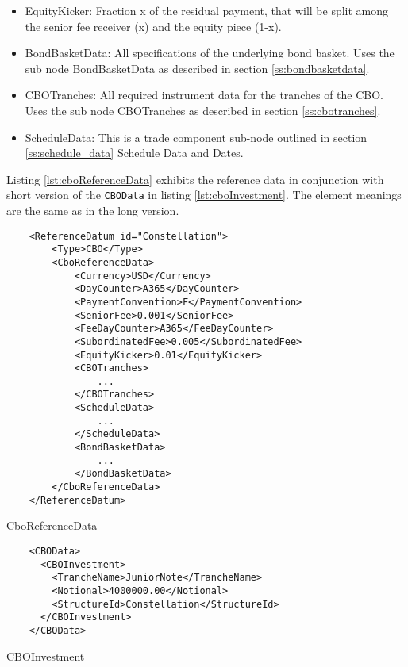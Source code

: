\begin{itemize}
\item EquityKicker: Fraction x of the residual payment, that will be split among the senior fee receiver (x) and the equity piece (1-x). 

\item BondBasketData: All specifications of the underlying bond basket. 
Uses the sub node BondBasketData as described in section \ref{ss:bondbasketdata}.

\item CBOTranches: All required instrument data for the tranches of the CBO. 
Uses the sub node CBOTranches as described in section \ref{ss:cbotranches}.

\item ScheduleData: This is a trade component sub-node outlined in section \ref{ss:schedule_data} Schedule Data and Dates.

\end{itemize}


Listing \ref{lst:cboReferenceData} exhibits the reference data in conjunction with short version of the {\tt CBOData} in listing \ref{lst:cboInvestment}.
The element meanings are the same as in the long version. 

\begin{listing}[H]
  \begin{verbatim}
    <ReferenceDatum id="Constellation">
        <Type>CBO</Type>
        <CboReferenceData>
            <Currency>USD</Currency>
            <DayCounter>A365</DayCounter>
            <PaymentConvention>F</PaymentConvention>
            <SeniorFee>0.001</SeniorFee>
            <FeeDayCounter>A365</FeeDayCounter>
            <SubordinatedFee>0.005</SubordinatedFee>
            <EquityKicker>0.01</EquityKicker>
            <CBOTranches>
                ...
            </CBOTranches>
            <ScheduleData>
                ...
            </ScheduleData>
            <BondBasketData>
                ...
            </BondBasketData>
        </CboReferenceData>
    </ReferenceDatum>
\end{verbatim}
\caption{CboReferenceData}
\label{lst:cboReferenceData}
\end{listing}


\begin{listing}[H]
  \begin{verbatim}
    <CBOData>
      <CBOInvestment>
        <TrancheName>JuniorNote</TrancheName>
        <Notional>4000000.00</Notional>
        <StructureId>Constellation</StructureId>
      </CBOInvestment>
    </CBOData>
\end{verbatim}
\caption{CBOInvestment}
\label{lst:cboInvestment}
\end{listing}

